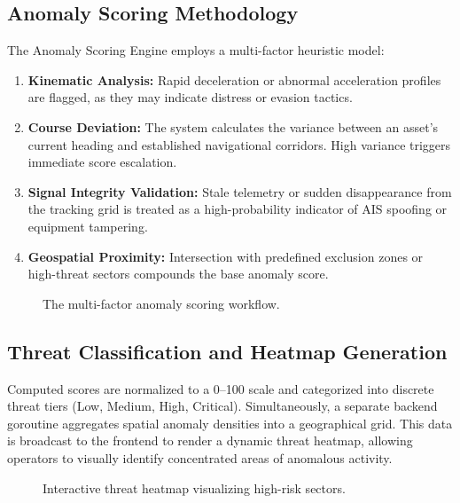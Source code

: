 \documentclass[11pt,a4paper]{article}
\begin{document}
\subsection{Anomaly Scoring Methodology}
The Anomaly Scoring Engine employs a multi-factor heuristic model:
\begin{enumerate}
    \item \textbf{Kinematic Analysis:} Rapid deceleration or abnormal acceleration profiles are flagged, as they may indicate distress or evasion tactics.
    \item \textbf{Course Deviation:} The system calculates the variance between an asset's current heading and established navigational corridors. High variance triggers immediate score escalation.
    \item \textbf{Signal Integrity Validation:} Stale telemetry or sudden disappearance from the tracking grid is treated as a high-probability indicator of AIS spoofing or equipment tampering.
    \item \textbf{Geospatial Proximity:} Intersection with predefined exclusion zones or high-threat sectors compounds the base anomaly score.
\end{enumerate}

\begin{figure}[h]
    \centering
    \caption{The multi-factor anomaly scoring workflow.}
    \label{fig:workflow}
\end{figure}

\subsection{Threat Classification and Heatmap Generation}
Computed scores are normalized to a 0–100 scale and categorized into discrete threat tiers (Low, Medium, High, Critical). Simultaneously, a separate backend goroutine aggregates spatial anomaly densities into a geographical grid. This data is broadcast to the frontend to render a dynamic threat heatmap, allowing operators to visually identify concentrated areas of anomalous activity.

\begin{figure}[h]
    \centering
    \caption{Interactive threat heatmap visualizing high-risk sectors.}
    \label{fig:heatmap}
\end{figure}
\end{document}
